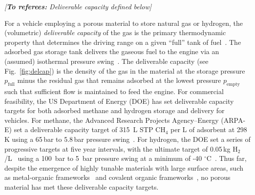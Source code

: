 \documentclass[twoside,twocolumn,9pt]{article}
\newcommand\startreferees[1]{\cbstart \noindent\textit{\color{red}%
[\textbf{To referees:} #1]}

}
\newcommand\donereferees{\cbend}
\newcommand\pfull{\ensuremath{p_{\text{full}}}}
\newcommand\pempty{\ensuremath{p_{\text{empty}}}}
\begin{document}
\startreferees{Deliverable capacity defined below}
For a vehicle employing a porous material to store natural gas or hydrogen, the
(volumetric) \emph{deliverable capacity} of the gas is the primary
thermodynamic property that determines the driving
range on a given ``full'' tank of fuel~\cite{mason2014evaluating}. 
The adsorbed gas storage tank delivers the
gaseous fuel to the engine via an (assumed) isothermal pressure
swing~\cite{sircar2002pressure}. The deliverable capacity (see
Fig.~\ref{fig:delcap}) is the density of the gas in the material at the storage
pressure $\pfull$ minus the residual gas that remains adsorbed at the lowest
pressure $\pempty$ such that sufficient flow is maintained to feed the engine.
For commercial feasibility, the US Department of Energy (DOE) has set
deliverable capacity targets for both adsorbed methane and hydrogen storage and
delivery for vehicles. For methane, the Advanced Research Projects
Agency--Energy (ARPA-E) set a deliverable capacity target of 315\ L STP CH$_4$
per L of adsorbent at 298 K using a 65\,bar to 5.8\,bar pressure
swing~\cite{simon2015materials}. For hydrogen, the DOE set a series of
progressive targets at five year intervals, with the ultimate target of 0.05\,kg
H$_2$/L~\cite{h2targetsDOE} using a 100\ bar to 5\ bar pressure swing at a
minimum of -40 $^\circ$C~\cite{allendorf2018assessment}. Thus far, despite the
emergence of highly tunable materials with large surface areas, such as
metal-organic frameworks~\cite{furukawa2013chemistry} and covalent organic 
frameworks~\cite{diercks2017atom}, no porous material has met these deliverable capacity targets.

\donereferees

\end{document}
